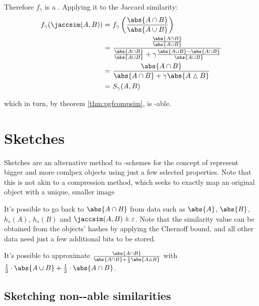 Therefore $f_\gamma$ is a \pgf. Applying it to the Jaccard similarity:
\begin{align*}
        f_\gamma (\jaccsim(A, B))
    =&\ f_\gamma \left( \frac{\abs{A \cap B}}{\abs{A \cup B}} \right) \\
    =&\ \frac{\frac{\abs{A \cap B}}{\abs{A \cup B}}} {\frac{\abs{A \cap B}}{\abs{A \cup B}} + \gamma \frac{\abs{A \cup B} - \abs{A \cap B}}{\abs{A \cup B}}} \\
    =&\ \frac{\abs{A \cap B}} {\abs{A \cap B} + \gamma \abs{A \vartriangle B}} \\
    =&\ S_\gamma(A, B)
\end{align*}

which in turn, by theorem \ref{thm:pgfcompsim}, is \lsh-able.


\section{Sketches}

Sketches are an alternative method to \lsh-schemes for the concept of  represent bigger and more comlpex objects using just a few selected properties. Note that this is not akin to a compression method, which seeks to exactly map an original object with a unique, smaller image

\begin{example}
    It's possible to go back to $\abs{A \cap B}$ from data such as $\abs{A}$, $\abs{B}$, $h_s(A)$, $h_s(B)$ and $\jaccsim(A, B) \pm \varepsilon$. Note that the similarity value can be obtained from the objects' hashes by applying the Chernoff bound, and all other data need just a few additional bits to be stored.
\end{example}

\begin{example}
    It's possible to approximate $\frac{\abs{A \cap B}}{\abs{A \cap B} + \frac{1}{2}\abs{A \vartriangle B}}$ with $\frac{1}{2} \cdot \abs{A \cup B} + \frac{1}{2} \cdot \abs{A \cap B}$.
\end{example}

    
    
    
    
\subsection{Sketching non-\lsh-able similarities}

